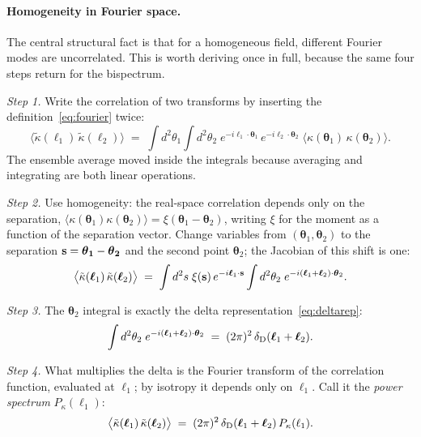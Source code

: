 \documentclass[11pt]{article}
\newcommand{\btheta}{\boldsymbol{\theta}}
\newcommand{\bell}{\boldsymbol{\ell}}
\numberwithin{equation}{section}
\begin{document}
\paragraph{Homogeneity in Fourier space.}
The central structural fact is that for a homogeneous field,
different Fourier modes are uncorrelated.  This is worth deriving
once in full, because the same four steps return for the bispectrum.

\emph{Step 1.}  Write the correlation of two transforms by inserting
the definition~\eqref{eq:fourier} twice:
\begin{equation}
  \bigl\langle \tilde\kappa(\bell_1)\,\tilde\kappa(\bell_2)
  \bigr\rangle
  \;=\;
  \int d^2\theta_1 \int d^2\theta_2\;
  e^{-i\bell_1\cdot\btheta_1}\, e^{-i\bell_2\cdot\btheta_2}\;
  \bigl\langle \kappa(\btheta_1)\,\kappa(\btheta_2) \bigr\rangle .
  \label{eq:pkstep1}
\end{equation}
The ensemble average moved inside the integrals because averaging and
integrating are both linear operations.

\emph{Step 2.}  Use homogeneity: the real-space correlation depends
only on the separation,
$\langle \kappa(\btheta_1)\kappa(\btheta_2)\rangle =
\xi(\btheta_1 - \btheta_2)$, writing $\xi$ for the moment as a
function of the separation vector.  Change variables from
$(\btheta_1, \btheta_2)$ to the separation
$\bf s = \btheta_1 - \btheta_2$ and the second point $\btheta_2$;
the Jacobian of this shift is one:
\begin{equation}
  \bigl\langle \tilde\kappa(\bell_1)\,\tilde\kappa(\bell_2)
  \bigr\rangle
  \;=\;
  \int d^2 s\;
  \xi({\bf s})\, e^{-i\bell_1\cdot{\bf s}}
  \int d^2\theta_2\;
  e^{-i(\bell_1 + \bell_2)\cdot\btheta_2} .
  \label{eq:pkstep2}
\end{equation}

\emph{Step 3.}  The $\btheta_2$ integral is exactly the delta
representation~\eqref{eq:deltarep}:
\begin{equation}
  \int d^2\theta_2\; e^{-i(\bell_1 + \bell_2)\cdot\btheta_2}
  \;=\; (2\pi)^2\, \delta_{\rm D}(\bell_1 + \bell_2) .
  \label{eq:pkstep3}
\end{equation}

\emph{Step 4.}  What multiplies the delta is the Fourier transform of
the correlation function, evaluated at $\bell_1$; by isotropy it
depends only on $\ell_1$.  Call it the \emph{power spectrum}
$P_\kappa(\ell_1)$:
\begin{equation}
  \bigl\langle \tilde\kappa(\bell_1)\,\tilde\kappa(\bell_2)
  \bigr\rangle
  \;=\; (2\pi)^2\, \delta_{\rm D}(\bell_1 + \bell_2)\,
  P_\kappa(\ell_1).
  \label{eq:powerdef}
\end{equation}
\end{document}

